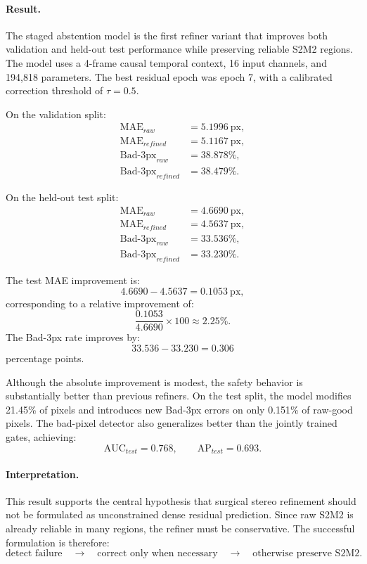 \documentclass[11pt,a4paper]{article}
\begin{document}
\paragraph{Result.}
The staged abstention model is the first refiner variant that improves both
validation and held-out test performance while preserving reliable S2M2 regions.
The model uses a 4-frame causal temporal context, 16 input channels, and 194,818
parameters. The best residual epoch was epoch 7, with a calibrated correction
threshold of \(\tau=0.5\).

On the validation split:
\[
\begin{aligned}
\mathrm{MAE}_{raw} &= 5.1996~\mathrm{px}, \\
\mathrm{MAE}_{refined} &= 5.1167~\mathrm{px}, \\
\mathrm{Bad}\text{-}3\mathrm{px}_{raw} &= 38.878\%, \\
\mathrm{Bad}\text{-}3\mathrm{px}_{refined} &= 38.479\%.
\end{aligned}
\]

On the held-out test split:
\[
\begin{aligned}
\mathrm{MAE}_{raw} &= 4.6690~\mathrm{px}, \\
\mathrm{MAE}_{refined} &= 4.5637~\mathrm{px}, \\
\mathrm{Bad}\text{-}3\mathrm{px}_{raw} &= 33.536\%, \\
\mathrm{Bad}\text{-}3\mathrm{px}_{refined} &= 33.230\%.
\end{aligned}
\]

The test MAE improvement is:
\[
4.6690 - 4.5637 = 0.1053~\mathrm{px},
\]
corresponding to a relative improvement of:
\[
\frac{0.1053}{4.6690} \times 100 \approx 2.25\%.
\]
The Bad-3px rate improves by:
\[
33.536 - 33.230 = 0.306
\]
percentage points.

Although the absolute improvement is modest, the safety behavior is substantially
better than previous refiners. On the test split, the model modifies 21.45\% of
pixels and introduces new Bad-3px errors on only 0.151\% of raw-good pixels. The
bad-pixel detector also generalizes better than the jointly trained gates,
achieving:
\[
\mathrm{AUC}_{test} = 0.768,
\qquad
\mathrm{AP}_{test} = 0.693.
\]

\paragraph{Interpretation.}
This result supports the central hypothesis that surgical stereo refinement
should not be formulated as unconstrained dense residual prediction. Since raw
S2M2 is already reliable in many regions, the refiner must be conservative. The
successful formulation is therefore:
\[
\text{detect failure}
\quad \rightarrow \quad
\text{correct only when necessary}
\quad \rightarrow \quad
\text{otherwise preserve S2M2}.
\]
\end{document}
